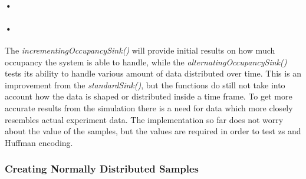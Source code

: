 \documentclass[a4paper, 12pt]{report}
\begin{document}
\begin{minipage}{\linewidth}

\end{minipage}

\paragraph{•}
\begin{minipage}{\linewidth}

\end{minipage}


\paragraph{•} 
The \textit{incrementingOccupancySink()} will provide initial results on how much occupancy the system is able to handle, while the \textit{alternatingOccupancySink()} tests its ability to handle various amount of data distributed over time.
This is an improvement from the \textit{standardSink()}, but the functions do still not take into account how the data is shaped or distributed inside a time frame.
To get more accurate results from the simulation there is a need for data which more closely resembles actual experiment data.
The implementation so far does not worry about the value of the samples, but the values are required in order to test \gls{zs} and Huffman encoding.

\subsubsection{Creating Normally Distributed Samples}
\label{subsubsec:normal-distribution}
\end{document}
